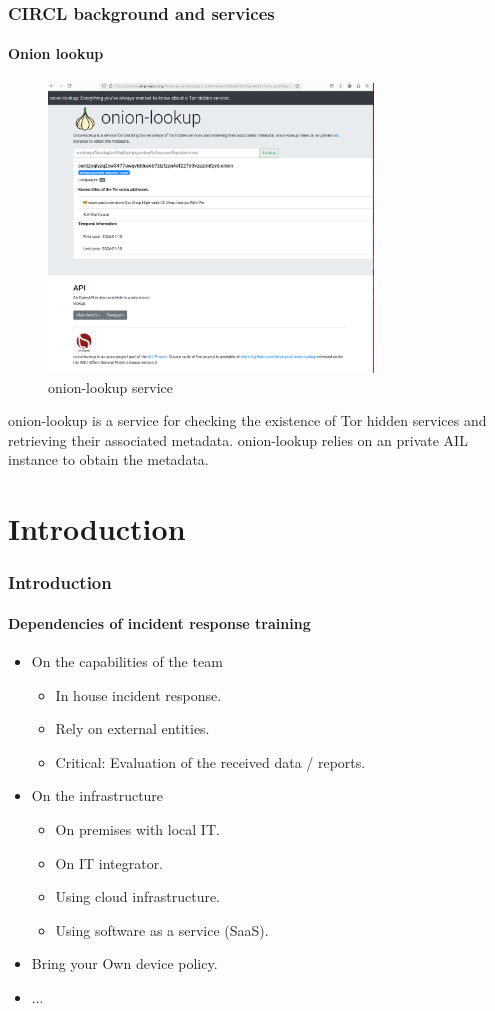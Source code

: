 \begin{frame}
 \frametitle{CIRCL background and services}
  \framesubtitle{Onion lookup}
    \begin{figure}[H]
        \centering
        \includegraphics[width=0.77\textwidth]{onion.png}
        \caption{ onion-lookup service}
	\label{onion}
    \end{figure}
       onion-lookup is a service for checking the existence of Tor hidden services and retrieving their associated metadata. onion-lookup relies on an private AIL instance to obtain the metadata.
\end{frame}


\section{Introduction}

\begin{frame}
	\frametitle{Introduction}
	\framesubtitle{Dependencies of incident response training}
	\begin{itemize}
		\item On the capabilities of the team
		\begin{itemize}
			\item In house incident response.
			\item Rely on external entities.
			\item \alert{Critical: Evaluation of the received data / reports}.
		\end{itemize}
		\item On the infrastructure
		\begin{itemize}
			\item On premises with local IT.
			\item On IT integrator.
			\item Using cloud  infrastructure.
			\item Using software as a service (SaaS).
		\end{itemize}
		\item Bring your Own device policy.
		\item ...
	\end{itemize}
\end{frame}

